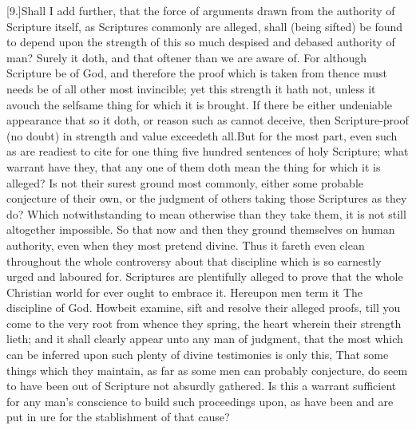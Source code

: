 [9.]Shall I add further, that the force of arguments drawn from the authority of Scripture itself, as Scriptures commonly are alleged, shall (being sifted) be found to depend upon the strength of this so much despised and debased authority of man? Surely it doth, and that oftener than we are aware of. For although Scripture be of God, and therefore the proof which is taken from thence must needs be of all other most invincible; yet this strength it hath not, unless it avouch the selfsame thing for which it is brought. If there be either undeniable appearance that so it doth, or reason such as cannot deceive, then Scripture-proof (no  doubt) in strength and value exceedeth all.But for the most part, even such as are readiest to cite for one thing five hundred sentences of holy Scripture; what warrant have they, that any one of them doth mean the thing for which it is alleged? Is not their surest ground most commonly, either some probable conjecture of their own, or the judgment of others taking those Scriptures as they do? Which notwithstanding to mean otherwise than they take them, it is not still altogether impossible. So that now and then they ground themselves on human authority, even when they most pretend divine. Thus it fareth even clean throughout the whole controversy about that discipline which is so earnestly urged and laboured for. Scriptures are plentifully alleged to prove that the whole Christian world for ever ought to embrace it. Hereupon men term it The discipline of God. Howbeit examine, sift and resolve their alleged proofs, till you come to the very root from whence they spring, the heart wherein their strength lieth; and it shall clearly appear unto any man of judgment, that the most which can be inferred upon such plenty of divine testimonies is only this, That some things which they maintain, as far as some men can probably conjecture, do seem to have been out of Scripture not absurdly gathered. Is this a warrant sufficient for any man’s conscience to build such proceedings upon, as have been and are put in ure for the stablishment of that cause?


